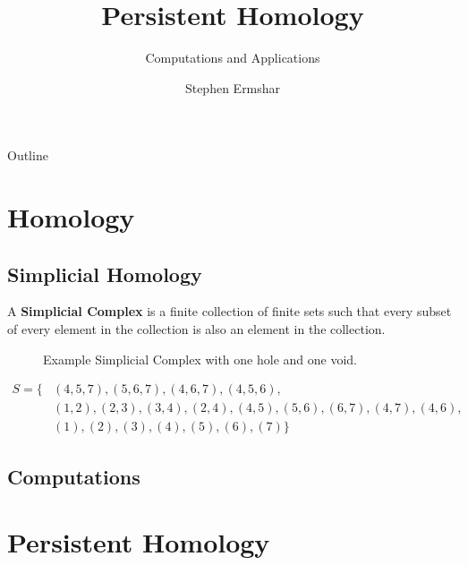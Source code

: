 

\title{Persistent Homology}
\subtitle{Computations and Applications}
\author{Stephen Ermshar}
\date{}






\begin{frame}
    \titlepage
\end{frame}

\begin{frame}{Outline}
	\tableofcontents
\end{frame}

\section[Homology]{Homology}
\subsection{Simplicial Homology}
\begin{frame}
	\begin{definition}
		A \textbf{Simplicial Complex} is a finite collection of finite sets such that every subset of every element in the collection is also an element in the collection. \cite{wagner}
	\end{definition}
	\begin{figure}
		
		\caption{Example Simplicial Complex with one hole and one void.}
	\end{figure}
	\begin{align*}
		S = \{&
			(4,5,7), (5,6,7), (4,6,7), (4,5,6),\\
			&(1,2), (2,3), (3,4), (2,4), (4,5), (5,6), (6,7), (4,7),
			(4,6),\\
			&(1), (2), (3), (4), (5), (6), (7)
		\}
	\end{align*}
\end{frame}
\subsection{Computations}
\begin{frame}
\end{frame}


\section[Persistence]{Persistent Homology}
